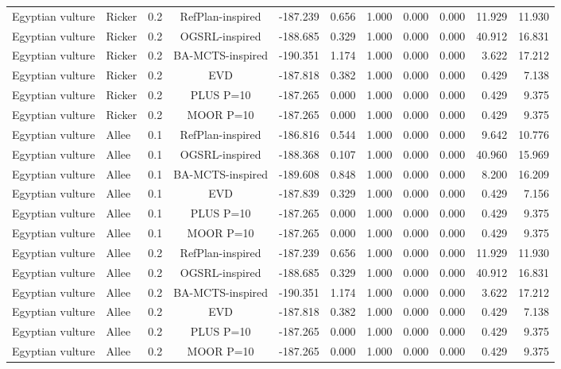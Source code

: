 \documentclass[10pt]{article}
\begin{document}
\begin{landscape}
\begin{center}
\begin{longtable}{@{}lllclrrrrrr@{}}
Egyptian vulture & Ricker & 0.2 & RefPlan-inspired & -187.239 & 0.656 & 1.000 & 0.000 & 0.000 & 11.929 & 11.930 \\
Egyptian vulture & Ricker & 0.2 & OGSRL-inspired & -188.685 & 0.329 & 1.000 & 0.000 & 0.000 & 40.912 & 16.831 \\
Egyptian vulture & Ricker & 0.2 & BA-MCTS-inspired & -190.351 & 1.174 & 1.000 & 0.000 & 0.000 & 3.622 & 17.212 \\
Egyptian vulture & Ricker & 0.2 & EVD & -187.818 & 0.382 & 1.000 & 0.000 & 0.000 & 0.429 & 7.138 \\
Egyptian vulture & Ricker & 0.2 & PLUS P=10 & -187.265 & 0.000 & 1.000 & 0.000 & 0.000 & 0.429 & 9.375 \\
Egyptian vulture & Ricker & 0.2 & MOOR P=10 & -187.265 & 0.000 & 1.000 & 0.000 & 0.000 & 0.429 & 9.375 \\
Egyptian vulture & Allee & 0.1 & RefPlan-inspired & -186.816 & 0.544 & 1.000 & 0.000 & 0.000 & 9.642 & 10.776 \\
Egyptian vulture & Allee & 0.1 & OGSRL-inspired & -188.368 & 0.107 & 1.000 & 0.000 & 0.000 & 40.960 & 15.969 \\
Egyptian vulture & Allee & 0.1 & BA-MCTS-inspired & -189.608 & 0.848 & 1.000 & 0.000 & 0.000 & 8.200 & 16.209 \\
Egyptian vulture & Allee & 0.1 & EVD & -187.839 & 0.329 & 1.000 & 0.000 & 0.000 & 0.429 & 7.156 \\
Egyptian vulture & Allee & 0.1 & PLUS P=10 & -187.265 & 0.000 & 1.000 & 0.000 & 0.000 & 0.429 & 9.375 \\
Egyptian vulture & Allee & 0.1 & MOOR P=10 & -187.265 & 0.000 & 1.000 & 0.000 & 0.000 & 0.429 & 9.375 \\
Egyptian vulture & Allee & 0.2 & RefPlan-inspired & -187.239 & 0.656 & 1.000 & 0.000 & 0.000 & 11.929 & 11.930 \\
Egyptian vulture & Allee & 0.2 & OGSRL-inspired & -188.685 & 0.329 & 1.000 & 0.000 & 0.000 & 40.912 & 16.831 \\
Egyptian vulture & Allee & 0.2 & BA-MCTS-inspired & -190.351 & 1.174 & 1.000 & 0.000 & 0.000 & 3.622 & 17.212 \\
Egyptian vulture & Allee & 0.2 & EVD & -187.818 & 0.382 & 1.000 & 0.000 & 0.000 & 0.429 & 7.138 \\
Egyptian vulture & Allee & 0.2 & PLUS P=10 & -187.265 & 0.000 & 1.000 & 0.000 & 0.000 & 0.429 & 9.375 \\
Egyptian vulture & Allee & 0.2 & MOOR P=10 & -187.265 & 0.000 & 1.000 & 0.000 & 0.000 & 0.429 & 9.375 \\

\end{longtable}
\end{center}
\end{landscape}
\end{document}
